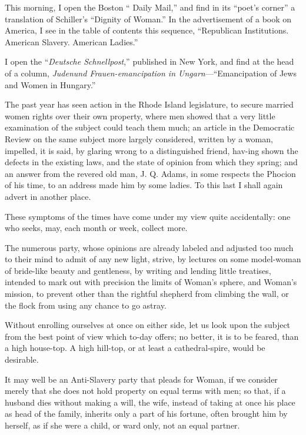 This morning, I open the Boston `` Daily Mail,'' and find in its
``poet's corner'' a translation of Schiller's ``Dignity of Woman.'' In
the advertisement of a book on America, I see in the table of contents
this sequence, ``Republican Institutions. American Slavery. American
Ladies.''

I open the ``\textit{Deutsche Schnellpost},'' published in New York,
and find at the head of a column, \textit{Judenund Frauen-emancipation
in Ungarn}---``Emancipation of Jews and Women in Hungary.''

The past year has seen action in the Rhode Island legislature, to
secure married women rights over their own property, where men showed
that a very little examination of the subject could teach them much;
an article in the Democratic Review on the same subject more largely
considered, written by a woman, impelled, it is said, by glaring wrong
to a distinguished friend, hav-ing shown the defects in the
existing laws, and the state of opinion from which they spring; and an
answer from the revered old man, J. Q. Adams, in some respects the
Phocion of his time, to an address made him by some ladies. To this
last I shall again advert in another place.

These symptoms of the times have come under my view quite
accidentally: one who seeks, may, each month or week, collect more.

The numerous party, whose opinions are already labeled and adjusted
too much to their mind to admit of any new light, strive, by lectures
on some model-woman of bride-like beauty and gentleness, by writing
and lending little treatises, intended to mark out with precision the
limits of Woman's sphere, and Woman's mission, to prevent other than
the rightful shepherd from climbing the wall, or the flock from
using any chance to go astray.

Without enrolling ourselves at once on either side, let us look upon
the subject from the best point of view which to-day offers; no
better, it is to be feared, than a high house-top. A high hill-top, or
at least a cathedral-spire, would be desirable.

It may well be an Anti-Slavery party that pleads for Woman, if we
consider merely that she does not hold property on equal terms with
men; so that, if a husband dies without making a will, the wife,
instead of taking at once his place as head of the family, inherits
only a part of his fortune, often brought him by herself, as if she
were a child, or ward only, not an equal partner.

